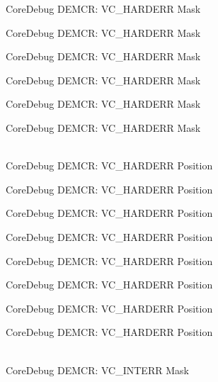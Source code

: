 \begin{DoxyRefList}
\label{deprecated__deprecated000200}%
%
Core\+Debug DEMCR:\+ VC\+\_\+\+HARDERR Mask 

\label{deprecated__deprecated000275}%
%
Core\+Debug DEMCR:\+ VC\+\_\+\+HARDERR Mask 

\label{deprecated__deprecated000342}%
%
Core\+Debug DEMCR:\+ VC\+\_\+\+HARDERR Mask 

\label{deprecated__deprecated000418}%
%
Core\+Debug DEMCR:\+ VC\+\_\+\+HARDERR Mask 

\label{deprecated__deprecated000507}%
%
Core\+Debug DEMCR:\+ VC\+\_\+\+HARDERR Mask 

\label{deprecated__deprecated000609}%
%
Core\+Debug DEMCR:\+ VC\+\_\+\+HARDERR Mask  
\item[{\parbox[t]{\linewidth}{Global \doxylink{group__CMSIS__CoreDebug_gaed9f42053031a9a30cd8054623304c0a}{Core\+Debug\+\_\+\+DEMCR\+\_\+\+VC\+\_\+\+HARDERR\+\_\+\+Pos} }}]\hfill \\
\label{deprecated__deprecated000055}%
%
Core\+Debug DEMCR:\+ VC\+\_\+\+HARDERR Position 

\label{deprecated__deprecated000135}%
%
Core\+Debug DEMCR:\+ VC\+\_\+\+HARDERR Position 

\label{deprecated__deprecated000199}%
%
Core\+Debug DEMCR:\+ VC\+\_\+\+HARDERR Position 

\label{deprecated__deprecated000274}%
%
Core\+Debug DEMCR:\+ VC\+\_\+\+HARDERR Position 

\label{deprecated__deprecated000341}%
%
Core\+Debug DEMCR:\+ VC\+\_\+\+HARDERR Position 

\label{deprecated__deprecated000417}%
%
Core\+Debug DEMCR:\+ VC\+\_\+\+HARDERR Position 

\label{deprecated__deprecated000506}%
%
Core\+Debug DEMCR:\+ VC\+\_\+\+HARDERR Position 

\label{deprecated__deprecated000608}%
%
Core\+Debug DEMCR:\+ VC\+\_\+\+HARDERR Position  
\item[{\parbox[t]{\linewidth}{Global \doxylink{group__CMSIS__CoreDebug_gad6815d8e3df302d2f0ff2c2c734ed29a}{Core\+Debug\+\_\+\+DEMCR\+\_\+\+VC\+\_\+\+INTERR\+\_\+\+Msk} }}]\hfill \\
\label{deprecated__deprecated000058}%
%
Core\+Debug DEMCR:\+ VC\+\_\+\+INTERR Mask 


\end{DoxyRefList}
